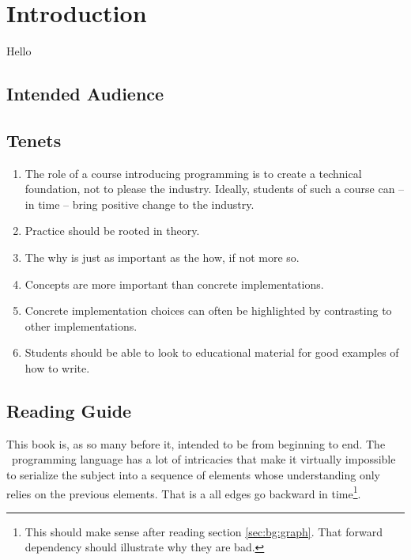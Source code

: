 \chapter{Introduction}
\label{sec:intro}

Hello

\section{Intended Audience}


\section{Tenets}

\begin{enumerate}
  \item The role of a course introducing programming is to create a technical foundation, not to please the industry. Ideally, students of such a course can -- in time -- bring positive change to the industry.
  \item Practice should be rooted in theory.
  \item The why is just as important as the how, if not more so.
  \item Concepts are more important than concrete implementations.
  \item Concrete implementation choices can often be highlighted by contrasting to other implementations.
  \item Students should be able to look to educational material for good examples of how to write.
\end{enumerate}

\section{Reading Guide}

This book is, as so many before it, intended to be  from beginning to end. The \csharp\ programming language has a lot of intricacies that make it virtually impossible to serialize the subject into a sequence of elements whose understanding only relies on the previous elements. That is a  all edges go backward in time\footnote{This should make sense after reading section \ref{sec:bg:graph}. That forward dependency should illustrate why they are bad.}.

